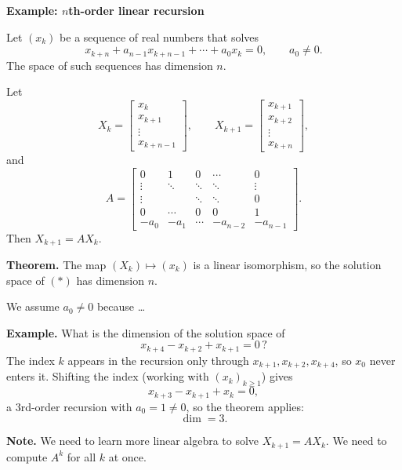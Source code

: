 \documentclass[letterpaper]{article}
\begin{document}
\textbf{Example: $n$th-order linear recursion}

Let $(x_k)$ be a sequence of real numbers that solves
\[
x_{k+n}+a_{n-1}x_{k+n-1}+\cdots+a_0x_k=0,
\qquad a_0\ne0. \tag{*}
\]
The space of such sequences has dimension $n$.

Let
\[
X_k=\begin{bmatrix}x_k\\x_{k+1}\\\vdots\\x_{k+n-1}\end{bmatrix},
\qquad
X_{k+1}=\begin{bmatrix}x_{k+1}\\x_{k+2}\\\vdots\\x_{k+n}\end{bmatrix},
\]
and
\[
A=
\begin{bmatrix}
0&1&0&\cdots&0\\
\vdots&\ddots&\ddots&\ddots&\vdots\\
\vdots&&\ddots&\ddots&0\\
0&\cdots&0&0&1\\
-a_0&-a_1&\cdots&-a_{n-2}&-a_{n-1}
\end{bmatrix}.
\]
Then $X_{k+1}=AX_k$.

\bigskip

\textbf{Theorem.} The map $(X_k)\mapsto(x_k)$ is a linear isomorphism, so the solution space of $(*)$ has dimension $n$.

We assume $a_0\ne0$ because \ldots

\bigskip

\textbf{Example.} What is the dimension of the solution space of
\[
x_{k+4}-x_{k+2}+x_{k+1}=0\,?
\]
The index $k$ appears in the recursion only through $x_{k+1},x_{k+2},x_{k+4}$, so $x_0$ never enters it. Shifting the index (working with $(x_k)_{k\geq1}$) gives
\[
x_{k+3}-x_{k+1}+x_k=0,
\]
a 3rd-order recursion with $a_0=1\ne0$, so the theorem applies:
\[
\dim=3.
\]

\bigskip

\textbf{Note.} We need to learn more linear algebra to solve $X_{k+1}=AX_k$. We need to compute $A^k$ for all $k$ at once.
\end{document}
